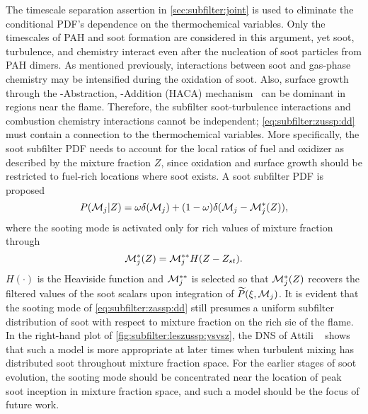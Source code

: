 The timescale separation assertion in \cref{sec:subfilter:joint} is used to eliminate the conditional PDF's dependence on the thermochemical variables. Only the timescales of PAH and soot formation are considered in this argument, yet soot, turbulence, and chemistry interact even after the nucleation of soot particles from PAH dimers. As mentioned previously, interactions between soot and gas-phase chemistry may be intensified during the oxidation of soot. Also, surface growth through the -Abstraction, -Addition (HACA) mechanism~\cite{frenklach1985,frenklach1991} can be dominant in regions near the flame. Therefore, the subfilter soot-turbulence interactions and combustion chemistry interactions cannot be independent; \cref{eq:subfilter:zussp:dd} must contain a connection to the thermochemical variables. More specifically, the soot subfilter PDF needs to account for the local ratios of fuel and oxidizer as described by the mixture fraction $Z$, since oxidation and surface growth should be restricted to fuel-rich locations where soot exists. A soot subfilter PDF is proposed
\begin{equation}\label{eq:subfilter:zassp:dd}
  P(\mathcal{M}_j|Z) = \omega\delta(\mathcal{M}_j) + (1 - \omega)\delta(\mathcal{M}_j - \mathcal{M}_j^*(Z)),
\end{equation}
where the sooting mode is activated only for rich values of mixture fraction through
\begin{equation}\label{eq:subfilter:zassp:mstar}
  \mathcal{M}_j^*(Z) = \mathcal{M}_j^{**}H(Z - Z_{st}).
\end{equation}
$H(\cdot)$ is the Heaviside function and $\mathcal{M}_j^{**}$ is selected so that $\mathcal{M}_j^*(Z)$ recovers the filtered values of the soot scalars upon integration of $\widetilde{P}(\xi,\mathcal{M}_j)$. It is evident that the sooting mode of \cref{eq:subfilter:zassp:dd} still presumes a uniform subfilter distribution of soot with respect to mixture fraction on the rich sie of the flame. In the right-hand plot of \cref{fig:subfilter:leszussp:ysvsz}, the DNS of Attili \etal~\cite{attili2014} shows that such a model is more appropriate at later times when turbulent mixing has distributed soot throughout mixture fraction space. For the earlier stages of soot evolution, the sooting mode should be concentrated near the location of peak soot inception in mixture fraction space, and such a model should be the focus of future work. %

